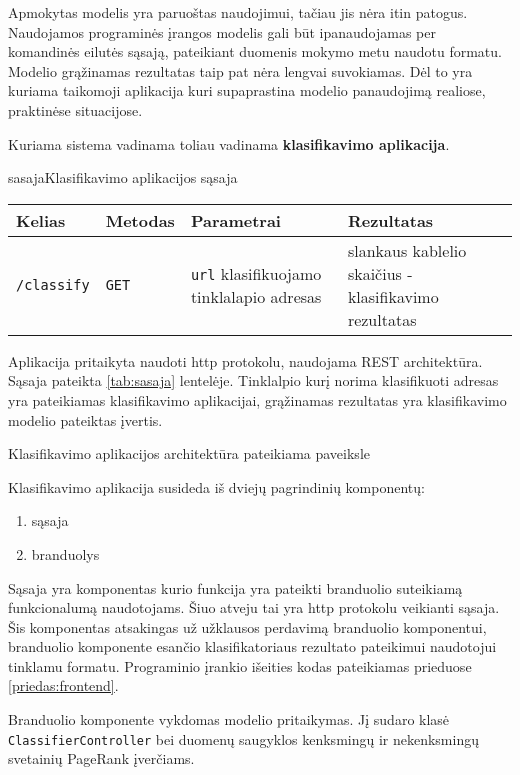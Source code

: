 
Apmokytas modelis yra paruoštas naudojimui, tačiau jis nėra itin patogus. Naudojamos programinės įrangos modelis gali būt ipanaudojamas per komandinės eilutės sąsają, pateikiant duomenis mokymo metu naudotu formatu. Modelio grąžinamas rezultatas taip pat nėra lengvai suvokiamas. Dėl to yra kuriama taikomoji aplikacija kuri supaprastina modelio panaudojimą realiose, praktinėse situacijose.

Kuriama sistema vadinama toliau vadinama \textbf{klasifikavimo aplikacija}.

\begin{ktutable}{sasaja}{Klasifikavimo aplikacijos sąsaja}
    \begin{tabular}{|l|l|p{5cm}|p{5cm}|}
    \hline
        Kelias & Metodas & Parametrai & Rezultatas \\ \hline
        \texttt{/classify} & \texttt{GET} & \texttt{url} klasifikuojamo tinklalapio adresas & slankaus kablelio skaičius - klasifikavimo rezultatas \\ \hline
    \end{tabular}
\end{ktutable}

Aplikacija pritaikyta naudoti http protokolu, naudojama REST architektūra. Sąsaja pateikta \vref{tab:sasaja} lentelėje. Tinklalpio kurį norima klasifikuoti adresas yra pateikiamas klasifikavimo aplikacijai, grąžinamas rezultatas yra klasifikavimo modelio pateiktas įvertis.

Klasifikavimo aplikacijos architektūra pateikiama paveiksle 


Klasifikavimo aplikacija susideda iš dviejų pagrindinių komponentų:
\begin{enumerate}
\item sąsaja
\item branduolys
\end{enumerate}
Sąsaja yra komponentas kurio funkcija yra pateikti branduolio suteikiamą funkcionalumą naudotojams. Šiuo atveju tai yra http protokolu veikianti sąsaja. Šis komponentas atsakingas už užklausos perdavimą branduolio komponentui, branduolio komponente esančio klasifikatoriaus rezultato pateikimui naudotojui tinklamu formatu. Programinio įrankio išeities kodas pateikiamas prieduose \vref{priedas:frontend}.

Branduolio komponente vykdomas modelio pritaikymas. Jį sudaro klasė \texttt{ClassifierController} bei duomenų saugyklos kenksmingų ir nekenksmingų svetainių PageRank įverčiams.

